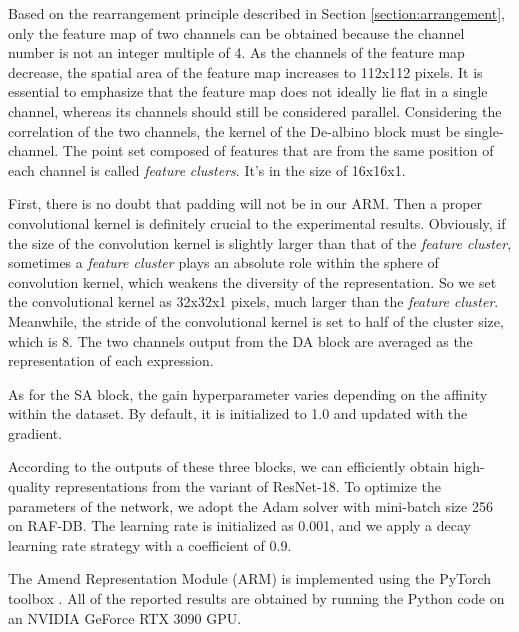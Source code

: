 \documentclass[10pt,twocolumn,letterpaper]{article}
\begin{document}
	 Based on the rearrangement principle described in Section \ref{section:arrangement}, only the feature map of two channels can be obtained because the channel number is not an integer multiple of 4. As the channels of the feature map decrease, the spatial area of the feature map increases to 112x112 pixels. It is essential to emphasize that the feature map does not ideally lie flat in a single channel, whereas its channels should still be considered parallel. Considering the correlation of the two channels, the kernel of the De-albino block must be single-channel. The point set composed of features that are from the same position of each channel is called \emph{feature} \emph{clusters}. It's in the size of 16x16x1. 

	First, there is no doubt that padding will not be in our ARM. Then a proper convolutional kernel is definitely crucial to the experimental results. Obviously, if the size of the convolution kernel is slightly larger than that of the \emph{feature cluster}, sometimes a \emph{feature cluster} plays an absolute role within the sphere of convolution kernel, which weakens the diversity of the representation. So we set the convolutional kernel as 32x32x1 pixels, much larger than the \emph{feature cluster}. Meanwhile, the stride of the convolutional kernel is set to half of the cluster size, which is 8. The two channels output from the DA block are averaged as the representation of each expression.


	As for the SA block, the gain hyperparameter  varies depending on the affinity within the dataset. By default, it is initialized to 1.0 and updated with the gradient.

	According to the outputs of these three blocks, we can efficiently obtain high-quality representations from the variant of ResNet-18. To optimize the parameters of the network, we adopt the Adam solver \cite{adam} with mini-batch size 256 on RAF-DB. The learning rate is initialized as 0.001, and we apply a decay learning rate strategy with a coefficient of 0.9.

The Amend Representation Module (ARM) is implemented using the PyTorch toolbox \cite{pytorch}. All of the reported results are obtained by running the Python code on an NVIDIA GeForce RTX 3090 GPU.
	
\end{document}
